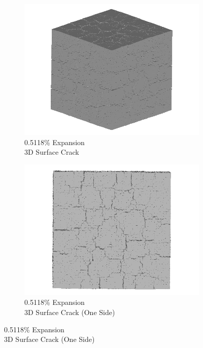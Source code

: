 \begin{figure}[ht!]
    \begin{subfigure}{.5\textwidth}
      \centering
      \includegraphics[width=0.5\linewidth]{Files/exp_3D/DEF/A30X-5C_3_3d.png}
      \caption{0.5118\% Expansion\\3D Surface Crack}
    \end{subfigure}%
    \begin{subfigure}{.5\textwidth}
      \centering
      \includegraphics[width=0.5\linewidth]{Files/exp_3D/DEF/A30X-5C_3_3ds.png}
      \caption{0.5118\% Expansion\\3D Surface Crack (One Side)}
    \end{subfigure}%


\end{figure}
